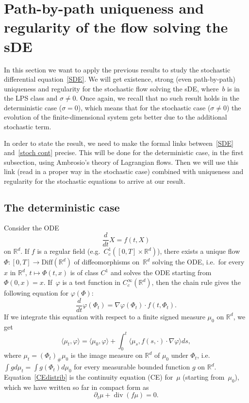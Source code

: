 \documentclass[a4paper,10pt]{article}
\newcommand\1{\mathbbm{1}}
\newcommand{\lan}{\langle}
\newcommand{\ran}{\rangle}
\DeclareMathOperator{\diverg}{div}
\numberwithin{equation}{section}
\begin{document}
\section{Path-by-path uniqueness and regularity of the flow solving the sDE}\label{section flow}

In this section we want to apply the previous results to study the stochastic differential equation~\eqref{SDE}. We will get existence, strong (even path-by-path) uniqueness and regularity for the stochastic flow solving the sDE, where~$b$ is in the LPS class and $\sigma\neq0$. Once again, we recall that no such result holds in the deterministic case ($\sigma=0$), which means that for the stochastic case ($\sigma \neq 0$) the evolution of the finite-dimensional system gets better due to the additional stochastic term.

In order to state the result, we need to make the formal links between~\eqref{SDE} and~\eqref{stoch cont} precise. This will be done for the deterministic case, in the first subsection, using Ambrosio's theory of Lagrangian flows. Then we will use this link (read in a proper way in the stochastic case) combined with uniqueness and regularity for the stochastic equations to arrive at our result. 

\subsection{The deterministic case}\label{deterministic case subsection}

Consider the ODE
\begin{equation}
\frac{d}{dt}X =f(t,X) \label{ODEf}
\end{equation}
on $\mathbb{R}^d$. If $f$ is a regular field (e.g.~$C^1_c([0,T]\times\mathbb{R}^d)$), there exists a unique flow~$\Phi \colon [0,T] \to \mathrm{Diff}(\mathbb{R}^d)$ of diffeomorphisms on~$\mathbb{R}^d$ solving the ODE, i.e.~for every~$x$ in $\mathbb{R}^d$, $t\mapsto\Phi(t,x)$ is of class $C^1$ and solves the ODE starting from $\Phi(0,x)=x$. If~$\varphi$ is a test function in $C^\infty_c(\mathbb{R}^d)$, then the chain rule gives the following equation for $\varphi(\Phi)$:
\begin{equation*}
\frac{d}{dt}\varphi(\Phi_t)=\nabla\varphi(\Phi_t)\cdot f(t,\Phi_t) .
\end{equation*}
If we integrate this equation with respect to a finite signed measure $\mu_0$ on $\mathbb{R}^d$, we get
\begin{equation}\label{CEdistrib}
\lan\mu_t,\varphi\ran=\lan\mu_0,\varphi\ran+\int^t_0\lan\mu_s,f(s,\cdot)\cdot\nabla\varphi\ran ds ,
\end{equation}
where $\mu_t=(\Phi_t)_\#\mu_0$ is the image measure on $\mathbb{R}^d$ of $\mu_0$ under $\Phi_t$, i.e.\ $\int gd\mu_t=\int g(\Phi_t)d\mu_0$ for every measurable bounded function $g$ on $\mathbb{R}^d$. Equation~\eqref{CEdistrib} is the continuity equation (CE) for~$\mu$ (starting from~$\mu_0$), which we have written so far in compact form as
\begin{equation}\label{CE}\tag{CE}
\partial_t\mu+\diverg(f\mu)=0 .
\end{equation}
\end{document}
